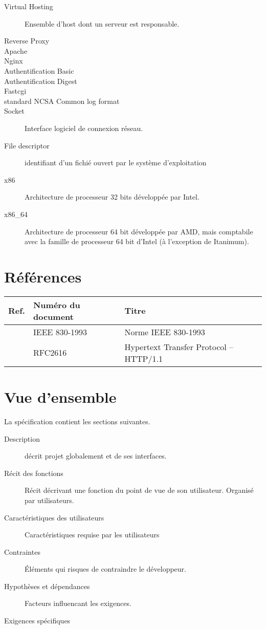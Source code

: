 \documentclass{scrreprt}
\begin{document}
\begin{description}
    \item[Virtual Hosting] Ensemble d'host dont un serveur est responsable.
    \item[Reverse Proxy] 
    \item[Apache]
    \item[Nginx]
    \item[Authentification Basic]
    \item[Authentification Digest]
    \item[Fastcgi]
    \item[standard NCSA Common log format]
    \item[Socket] Interface logiciel de connexion réseau.
    \item[File descriptor] identifiant d'un fichié ouvert par le système d'exploitation
    \item[x86] Architecture de processeur 32 bits développée par Intel.
    \item[x86_64] Architecture de processeur 64 bit développée par AMD, mais comptabile avec la famille de processeur 64 bit d'Intel (à l'exception de Itanimum).
\end{description}

\section{Références}
\begin{tabularx}{\textwidth}{|l|X|l|}
    \hline
    Ref. & Numéro du document & Titre \\
    \hline
    \cite{ieefr} & IEEE 830-1993 & Norme IEEE 830-1993 \\
    \hline
    \cite{http} & RFC2616 & Hypertext Transfer Protocol -- HTTP/1.1 \\
    \hline
\end{tabularx}

\section{Vue d'ensemble}
La spécification contient les sections suivantes.
\begin{description}
\item[Description] décrit projet globalement et de ses interfaces.
\item[Récit des fonctions] Récit décrivant une fonction du point de vue de son utilisateur. Organisé par utilisateurs.
\item[Caractéristiques des utilisateurs] Caractéristiques requise par les utilisateurs
\item[Contraintes] Éléments qui risques de contraindre le développeur.
\item[Hypothèses et dépendances] Facteurs influencant les exigences.
\item[Exigences spécifiques] 
\end{description}
\end{document}
